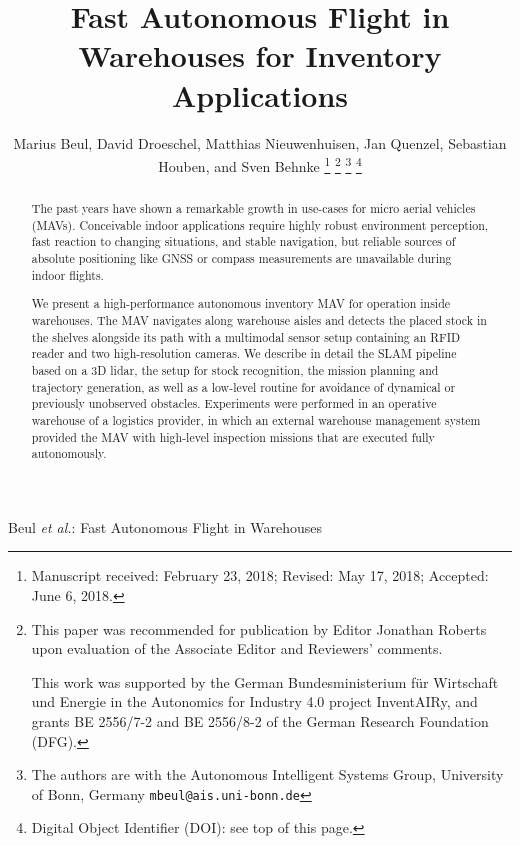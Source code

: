 \documentclass[letterpaper, 10 pt, journal, twoside]{IEEEtran}
\begin{document}
\title{Fast Autonomous Flight in Warehouses for Inventory Applications}

\author{Marius Beul, David Droeschel, Matthias Nieuwenhuisen, Jan Quenzel, Sebastian Houben, and Sven Behnke%
\thanks{Manuscript received: February 23, 2018; Revised: May 17, 2018; Accepted: June 6, 2018.}%
\thanks{This paper was recommended for publication by Editor Jonathan Roberts upon evaluation of the Associate Editor and Reviewers' comments.

This work was supported by the German Bundesministerium f\"ur Wirtschaft und Energie in the Autonomics for Industry 4.0 project InventAIRy, and grants BE 2556/7-2 and BE 2556/8-2 of the German Research Foundation (DFG).}%
\thanks{The authors are with the Autonomous Intelligent Systems Group, University of Bonn, Germany
        {\tt\footnotesize mbeul@ais.uni-bonn.de}}%
\thanks{Digital Object Identifier (DOI): see top of this page.}
}

{Beul \MakeLowercase{\textit{et al.}}: Fast Autonomous Flight in Warehouses}

\maketitle

\begin{abstract}
The past years have shown a remarkable growth in use-cases for micro aerial vehicles (MAVs). Conceivable indoor applications require highly robust environment perception, fast reaction to changing situations, and stable navigation, but reliable sources of absolute positioning like GNSS or compass measurements are unavailable during indoor flights.

We present a high-performance autonomous inventory MAV for operation inside warehouses. The MAV navigates along warehouse aisles and detects the placed stock in the shelves alongside its path with a multimodal sensor setup containing an RFID reader and two high-resolution cameras. We describe in detail the SLAM pipeline based on a 3D lidar, the setup for stock recognition, the mission planning and trajectory generation, as well as a low-level routine for avoidance of dynamical or previously unobserved obstacles. Experiments were performed in an operative warehouse of a logistics provider, in which an external warehouse management system provided the MAV with high-level inspection missions that are executed fully autonomously.
\end{abstract}
\end{document}

